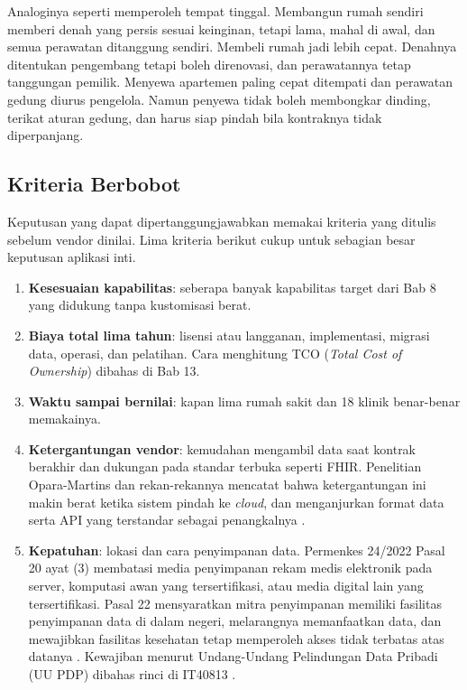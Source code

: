 Analoginya seperti memperoleh tempat tinggal. Membangun rumah sendiri memberi
denah yang persis sesuai keinginan, tetapi lama, mahal di awal, dan semua
perawatan ditanggung sendiri. Membeli rumah jadi lebih cepat. Denahnya
ditentukan pengembang tetapi boleh direnovasi, dan perawatannya tetap
tanggungan pemilik. Menyewa apartemen paling cepat ditempati dan perawatan
gedung diurus pengelola. Namun penyewa tidak boleh membongkar dinding, terikat
aturan gedung, dan harus siap pindah bila kontraknya tidak diperpanjang.

\subsection*{Kriteria Berbobot}

Keputusan yang dapat dipertanggungjawabkan memakai kriteria yang ditulis
sebelum vendor dinilai. Lima kriteria berikut cukup untuk sebagian besar
keputusan aplikasi inti.
\begin{enumerate}
  \item \textbf{Kesesuaian kapabilitas}: seberapa banyak kapabilitas target
        dari Bab 8 yang didukung tanpa kustomisasi berat.
  \item \textbf{Biaya total lima tahun}: lisensi atau langganan,
        implementasi, migrasi data, operasi, dan pelatihan. Cara menghitung
        TCO (\textit{Total Cost of Ownership}) dibahas di Bab 13.
  \item \textbf{Waktu sampai bernilai}: kapan lima rumah sakit dan 18 klinik
        benar-benar memakainya.
  \item \textbf{Ketergantungan vendor}: kemudahan mengambil data saat
        kontrak berakhir dan dukungan pada standar terbuka seperti FHIR.
        Penelitian Opara-Martins dan rekan-rekannya mencatat bahwa
        ketergantungan ini makin berat ketika sistem pindah ke
        \textit{cloud}, dan menganjurkan format data serta API yang
        terstandar sebagai penangkalnya \cite{c09-oparamartins2016}.
  \item \textbf{Kepatuhan}: lokasi dan cara penyimpanan data. Permenkes
        24/2022 Pasal 20 ayat (3) membatasi media penyimpanan rekam medis
        elektronik pada server, komputasi awan yang tersertifikasi, atau
        media digital lain yang tersertifikasi. Pasal 22 mensyaratkan mitra
        penyimpanan memiliki fasilitas penyimpanan data di dalam negeri,
        melarangnya memanfaatkan data, dan mewajibkan fasilitas kesehatan
        tetap memperoleh akses tidak terbatas atas datanya
        \cite{permenkes24-2022}. Kewajiban menurut Undang-Undang
        Pelindungan Data Pribadi (UU PDP) dibahas rinci di IT40813
        \cite{uu27-2022-pdp}.
\end{enumerate}

